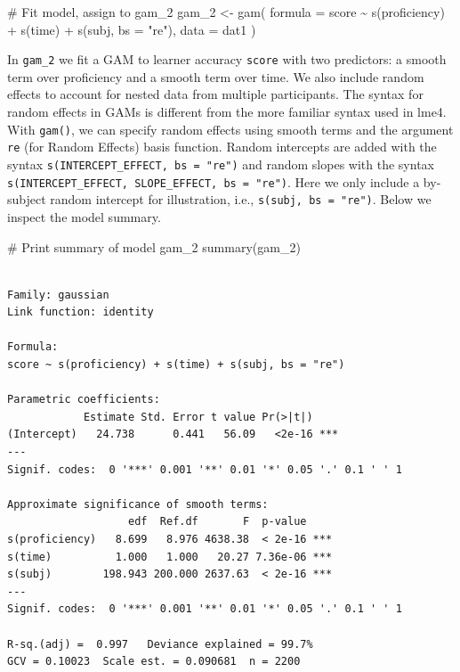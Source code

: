 \documentclass[
  letterpaper,
  DIV=11,
  numbers=noendperiod]{scrartcl}
\newenvironment{Shaded}{\begin{snugshade}}{\end{snugshade}}
\newcommand{\AttributeTok}[1]{\textcolor[rgb]{0.40,0.45,0.13}{#1}}
\newcommand{\CommentTok}[1]{\textcolor[rgb]{0.37,0.37,0.37}{#1}}
\newcommand{\FunctionTok}[1]{\textcolor[rgb]{0.28,0.35,0.67}{#1}}
\newcommand{\NormalTok}[1]{\textcolor[rgb]{0.00,0.23,0.31}{#1}}
\newcommand{\OtherTok}[1]{\textcolor[rgb]{0.00,0.23,0.31}{#1}}
\newcommand{\SpecialCharTok}[1]{\textcolor[rgb]{0.37,0.37,0.37}{#1}}
\newcommand{\StringTok}[1]{\textcolor[rgb]{0.13,0.47,0.30}{#1}}
\begin{document}
\begin{Shaded}
\begin{Highlighting}[]
\CommentTok{\# Fit model, assign to \textquotesingle{}gam\_2\textquotesingle{}}
\NormalTok{gam\_2 }\OtherTok{\textless{}{-}} \FunctionTok{gam}\NormalTok{(}
  \AttributeTok{formula =}\NormalTok{ score }\SpecialCharTok{\textasciitilde{}} \FunctionTok{s}\NormalTok{(proficiency) }\SpecialCharTok{+} \FunctionTok{s}\NormalTok{(time) }\SpecialCharTok{+} \FunctionTok{s}\NormalTok{(subj, }\AttributeTok{bs =} \StringTok{"re"}\NormalTok{),}
  \AttributeTok{data =}\NormalTok{ dat1}
\NormalTok{)}
\end{Highlighting}
\end{Shaded}

In \texttt{gam\_2} we fit a GAM to learner accuracy \texttt{score} with
two predictors: a smooth term over proficiency and a smooth term over
time. We also include random effects to account for nested data from
multiple participants. The syntax for random effects in GAMs is
different from the more familiar syntax used in lme4. With
\texttt{gam()}, we can specify random effects using smooth terms and the
argument \texttt{re} (for Random Effects) basis function. Random
intercepts are added with the syntax
\texttt{s(INTERCEPT\_EFFECT,\ bs\ =\ "re")} and random slopes with the
syntax \texttt{s(INTERCEPT\_EFFECT,\ SLOPE\_EFFECT,\ bs\ =\ "re")}. Here
we only include a by-subject random intercept for illustration, i.e.,
\texttt{s(subj,\ bs\ =\ "re")}. Below we inspect the model summary.

\begin{Shaded}
\begin{Highlighting}[]
\CommentTok{\# Print summary of model \textquotesingle{}gam\_2\textquotesingle{}}
\FunctionTok{summary}\NormalTok{(gam\_2)}
\end{Highlighting}
\end{Shaded}

\begin{verbatim}

Family: gaussian 
Link function: identity 

Formula:
score ~ s(proficiency) + s(time) + s(subj, bs = "re")

Parametric coefficients:
            Estimate Std. Error t value Pr(>|t|)    
(Intercept)   24.738      0.441   56.09   <2e-16 ***
---
Signif. codes:  0 '***' 0.001 '**' 0.01 '*' 0.05 '.' 0.1 ' ' 1

Approximate significance of smooth terms:
                   edf  Ref.df       F  p-value    
s(proficiency)   8.699   8.976 4638.38  < 2e-16 ***
s(time)          1.000   1.000   20.27 7.36e-06 ***
s(subj)        198.943 200.000 2637.63  < 2e-16 ***
---
Signif. codes:  0 '***' 0.001 '**' 0.01 '*' 0.05 '.' 0.1 ' ' 1

R-sq.(adj) =  0.997   Deviance explained = 99.7%
GCV = 0.10023  Scale est. = 0.090681  n = 2200
\end{verbatim}
\end{document}

